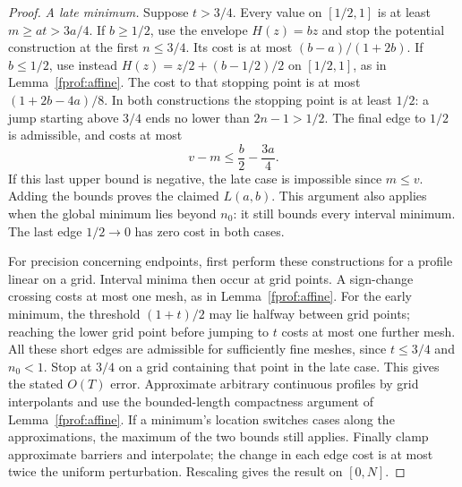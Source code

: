 \begin{proof}
\emph{A late minimum.} Suppose \(t>3/4\). Every value on \([1/2,1]\) is at least
\(m\ge at>3a/4\). If \(b\ge1/2\), use the envelope \(H(z)=bz\) and stop
the potential construction at the first \(n\le3/4\). Its cost is at most
\((b-a)/(1+2b)\). If \(b\le1/2\), use instead
\(H(z)=z/2+(b-1/2)/2\) on \([1/2,1]\), as in Lemma~\ref{fprof:affine}.
The cost to that stopping point is at most \((1+2b-4a)/8\).
In both constructions the stopping point is at least \(1/2\): a jump starting
above \(3/4\) ends no lower than \(2n-1>1/2\).
The final edge to \(1/2\) is admissible, and costs at most
$$
 v-m\le\frac b2-\frac{3a}{4}.
$$
If this last upper bound is negative, the late case is impossible since \(m\le v\).
Adding the bounds proves the claimed \(L(a,b)\). This argument also applies
when the global minimum lies beyond \(n_0\): it still bounds every interval minimum.
The last edge \(1/2\to0\) has zero cost in both cases.

For precision concerning endpoints, first perform these constructions for a profile
linear on a grid. Interval minima then occur at grid points. A sign-change crossing
costs at most one mesh, as in Lemma~\ref{fprof:affine}. For the early minimum,
the threshold \((1+t)/2\) may lie halfway between grid points; reaching the lower
grid point before jumping to \(t\) costs at most one further mesh.
All these short edges are admissible for sufficiently fine meshes, since
\(t\le3/4\) and \(n_0<1\). Stop at \(3/4\) on a grid containing that point
in the late case. This gives the stated \(O(T)\) error.
Approximate arbitrary continuous profiles by grid interpolants and use the
bounded-length compactness argument of Lemma~\ref{fprof:affine}. If a minimum's
location switches cases along the approximations, the maximum of the two bounds
still applies. Finally clamp approximate barriers and interpolate; the change
in each edge cost is at most twice the uniform perturbation. Rescaling gives
the result on \([0,N]\).
\end{proof}
